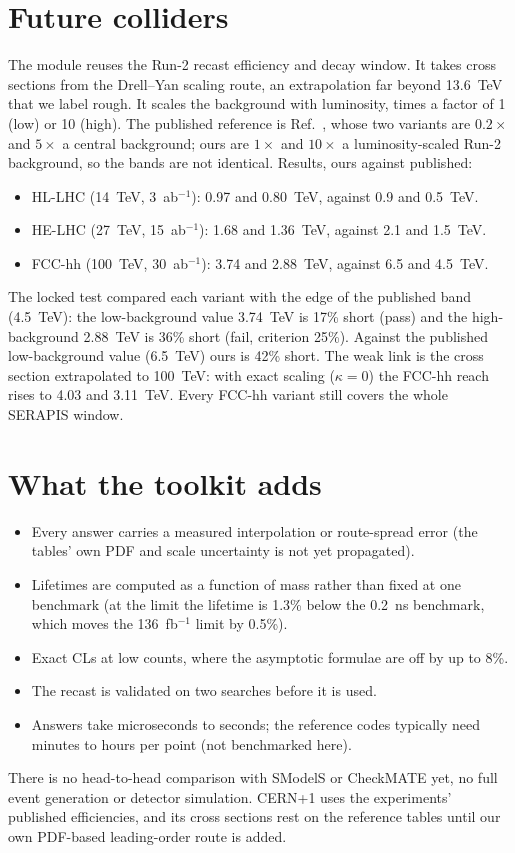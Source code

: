\documentclass[aps,prd,twocolumn,superscriptaddress,nofootinbib,showkeys]{revtex4-2}
\begin{document}
\section{Future colliders}
The module reuses the Run-2 recast efficiency and decay window. It takes cross sections from the Drell--Yan scaling route, an extrapolation far beyond 13.6~TeV that we label rough. It scales the background with luminosity, times a factor of 1 (low) or 10 (high). The published reference is Ref.~\cite{FCC}, whose two variants are $0.2\times$ and $5\times$ a central background; ours are $1\times$ and $10\times$ a luminosity-scaled Run-2 background, so the bands are not identical. Results, ours against published:
\begin{itemize}
\item HL-LHC (14~TeV, 3~ab$^{-1}$): 0.97 and 0.80~TeV, against 0.9 and 0.5~TeV.
\item HE-LHC (27~TeV, 15~ab$^{-1}$): 1.68 and 1.36~TeV, against 2.1 and 1.5~TeV.
\item FCC-hh (100~TeV, 30~ab$^{-1}$): 3.74 and 2.88~TeV, against 6.5 and 4.5~TeV.
\end{itemize}
The locked test compared each variant with the edge of the published band (4.5~TeV): the low-background value 3.74~TeV is 17\% short (pass) and the high-background 2.88~TeV is 36\% short (fail, criterion 25\%). Against the published low-background value (6.5~TeV) ours is 42\% short. The weak link is the cross section extrapolated to 100~TeV: with exact scaling ($\kappa=0$) the FCC-hh reach rises to 4.03 and 3.11~TeV. Every FCC-hh variant still covers the whole SERAPIS window.

\section{What the toolkit adds}
\begin{itemize}
\item Every answer carries a measured interpolation or route-spread error (the tables' own PDF and scale uncertainty is not yet propagated).
\item Lifetimes are computed as a function of mass rather than fixed at one benchmark (at the limit the lifetime is 1.3\% below the 0.2~ns benchmark, which moves the 136~fb$^{-1}$ limit by 0.5\%).
\item Exact CLs at low counts, where the asymptotic formulae are off by up to 8\%.
\item The recast is validated on two searches before it is used.
\item Answers take microseconds to seconds; the reference codes typically need minutes to hours per point (not benchmarked here).
\end{itemize}
There is no head-to-head comparison with SModelS or CheckMATE yet, no full event generation or detector simulation. CERN+1 uses the experiments' published efficiencies, and its cross sections rest on the reference tables until our own PDF-based leading-order route is added.
\end{document}
